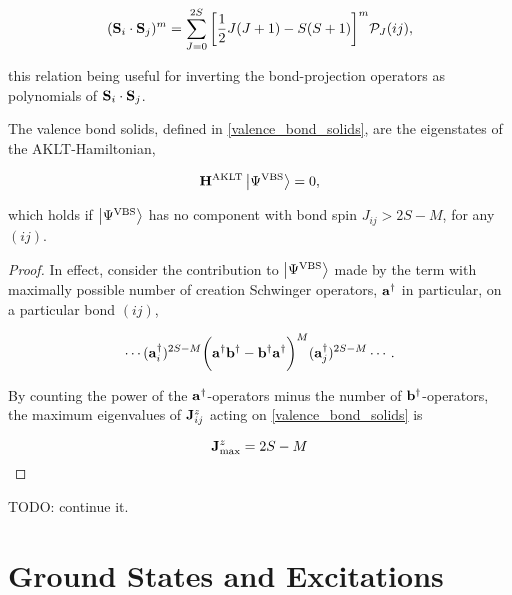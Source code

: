 \begin{equation}
    ({\bf S}_i \cdot {\bf S}_j)^m = \sum_{J = 0}^{2S} \bigg[\frac{1}{2} J(J+1) - S(S+1)\bigg]^m \mathcal{P}_J (ij),
\end{equation}

this relation being useful for inverting the bond-projection operators as polynomials of ${\bf S}_i \cdot {\bf S}_j$. \\

\begin{lemma}

The valence bond solids, defined in \cref{valence_bond_solids}, are the eigenstates of the AKLT-Hamiltonian, 

\begin{equation}
     {\bf H}^{\textnormal{AKLT}} \ket{\Psi^{\textnormal{VBS}}} = 0,
\end{equation}

which holds if $\ket{\Psi^{\textnormal{VBS}}}$ has no component with bond spin $J_{ij} > 2S - M $, for any $(ij)$.

\end{lemma}

\begin{proof}

In effect, consider the contribution to $\ket{\Psi^{\textnormal{VBS}}}$ made by the term with maximally possible number of creation Schwinger operators, ${\bf a}^\dagger$ in particular, on a particular bond $(ij)$,

\begin{equation}
    \cdots ({\bf a}_i^\dagger)^{2S-M} \bigg({\bf a}^\dagger {\bf b}^\dagger - {\bf b}^\dagger {\bf a}^\dagger \bigg)^{M} ({\bf a}_j^\dagger)^{2S-M}\cdots.
\end{equation}

By counting the power of the ${\bf a}^\dagger$-operators minus the number of ${\bf b}^\dagger$-operators, the maximum eigenvalues of ${\bf J}_{ij}^z$ acting on \cref{valence_bond_solids}
is 

\begin{equation}
    {\bf J}^z_{\textnormal{max}} = 2S-M
\end{equation}

\end{proof}

TODO: continue it. 

\clearpage

\section{\textbf{Ground States and Excitations}}

